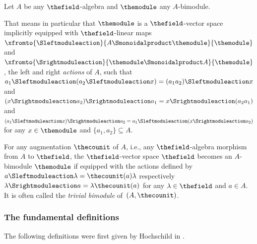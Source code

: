 \documentclass[pdftex]{sigma}
\numberwithin{equation}{section}
\begin{document}
{
  \newcommand{\thealgebra}{A}
\begin{Assumptions}
  Let $\thealgebra$ be any $\thefield$-algebra and $\themodule$ any $\thealgebra$-bimodule.
\end{Assumptions}
{
  \newcommand{\firstop}{a_1}
  \newcommand{\secondop}{a_2}
  \newcommand{\anyvector}{x}
That means in particular that $\themodule$ is a $\thefield$-vector space implicitly equipped with $\thefield$-linear maps  $\xfromto{\Sleftmoduleaction}{\thealgebra\Smonoidalproduct\themodule}{\themodule}$ and $\xfromto{\Srightmoduleaction}{\themodule\Smonoidalproduct\thealgebra}{\themodule}$, the left and right \emph{actions} of $\thealgebra$,  such that $\firstop\Sleftmoduleaction(\secondop\Sleftmoduleaction\anyvector)=(\firstop\secondop)\Sleftmoduleaction\anyvector$ and $(\anyvector\Srightmoduleaction\secondop)\Srightmoduleaction\firstop=\anyvector\Srightmoduleaction(\secondop\firstop)$ and $(\firstop\Sleftmoduleaction \anyvector)\Srightmoduleaction\secondop=\firstop\Sleftmoduleaction( \anyvector\Srightmoduleaction\secondop)$ for any $\anyvector\in\themodule$ and $\{\firstop,\secondop\}\subseteq \thealgebra$.
}
\begin{Example}
  \label{example:trivial_bimodule}
  \newcommand{\anyscalar}{\lambda}
  \newcommand{\anyop}{a}
    For any augmentation $\thecounit$ of $\thealgebra$, i.e., any $\thefield$-algebra morphism from $\thealgebra$ to $\thefield$, the $\thefield$-vector space $\thefield$ becomes an $\thealgebra$-bimodule $\themodule$ if equipped with the
    actions defined by $\anyop\Sleftmoduleaction\anyscalar= \thecounit(\anyop)\anyscalar$ respectively $\anyscalar\Srightmoduleaction\anyop= \anyscalar\thecounit(\anyop)$ for any $\anyscalar\in\thefield$ and $\anyop\in \thealgebra$. It is often called the \emph{trivial bimodule} of~$(\thealgebra,\thecounit)$.
\end{Example}
\subsubsection{The fundamental definitions}
\label{section:hochschild-general-definitions}
The following definitions were first given by Hochschild in \cite{Hochschild1956}.

}
\end{document}
